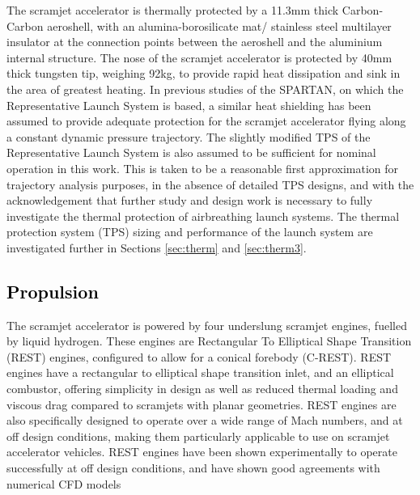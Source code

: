 \noindent
The scramjet accelerator is thermally protected by a 11.3mm thick Carbon-Carbon aeroshell, with an alumina-borosilicate mat/ stainless steel multilayer insulator at the connection points between the aeroshell and the aluminium internal structure\cite{Preller2018a}. The nose of the scramjet accelerator is protected by 40mm thick tungsten tip, weighing 92kg, to provide rapid heat dissipation and sink in the area of greatest heating.
 In previous studies of the SPARTAN, on which the Representative Launch System is based, a similar heat shielding has been assumed to provide adequate protection for the scramjet accelerator flying along a constant dynamic pressure trajectory\cite{Preller2018a}. The slightly modified TPS of the Representative Launch System is also assumed to be sufficient for nominal operation in this work. This is taken to be a reasonable first approximation for trajectory analysis purposes, in the absence of detailed TPS designs, and with the acknowledgement that further study and design work is necessary to fully investigate the thermal protection of airbreathing launch systems.
 The thermal protection system (TPS) sizing and performance of the launch system are investigated further in Sections \ref{sec:therm} and \ref{sec:therm3}.

\textcolor{black}{
\subsection{Propulsion}\label{sec:propulsion}
}
\noindent
The scramjet accelerator is powered by four underslung scramjet engines, fuelled by liquid hydrogen. These engines are Rectangular To Elliptical Shape Transition (REST) engines, configured to allow for a conical forebody (C-REST). REST engines have a rectangular to elliptical shape transition inlet, and an elliptical combustor, offering simplicity in design as well as reduced thermal loading and viscous drag compared to scramjets with planar geometries\cite{Suraweera2009}.  REST engines are also specifically designed to operate over a wide range of Mach numbers, and at off design conditions, making them particularly applicable to use on scramjet accelerator vehicles. REST engines have been shown experimentally to operate successfully at off design conditions\cite{Smart2006,Smart2009b}, and have shown good agreements with numerical CFD models\cite{Smart2009b}


